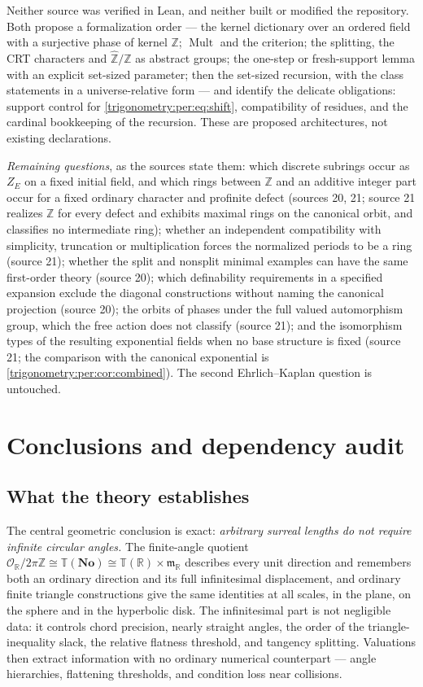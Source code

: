 \documentclass[11pt,letterpaper]{article}
\numberwithin{equation}{section}
\theoremstyle{definition}
\theoremstyle{remark}
\newcommand{\No}{\mathbf{No}}
\newcommand{\R}{\mathbb R}
\newcommand{\Z}{\mathbb Z}
\newcommand{\OO}{\mathcal O}
\newcommand{\mm}{\mathfrak m}
\newcommand{\TT}{\mathbb T}
\newcommand{\Mult}{\operatorname{Mult}}
\newcommand{\Zhat}{\widehat{\Z}}
\begin{document}
Neither source was verified in Lean, and neither built or modified the repository. Both propose a
formalization order --- the kernel dictionary over an ordered field with a surjective phase of kernel
$\Z$; $\Mult$ and the criterion; the splitting, the CRT characters and $\Zhat/\Z$ as abstract groups;
the one-step or fresh-support lemma with an explicit set-sized parameter; then the set-sized recursion,
with the class statements in a universe-relative form --- and identify the delicate obligations: support
control for \cref{trigonometry:per:eq:shift}, compatibility of residues, and the cardinal bookkeeping of
the recursion. These are proposed architectures, not existing declarations.

\emph{Remaining questions}, as the sources state them: which discrete subrings occur as $Z_E$ on a fixed
initial field, and which rings between $\Z$ and an additive integer part occur for a fixed ordinary
character and profinite defect (sources 20, 21; source 21 realizes $\Z$ for every defect and exhibits
maximal rings on the canonical orbit, and classifies no intermediate ring); whether an independent
compatibility with simplicity, truncation or multiplication forces the normalized periods to be a ring
(source 21); whether the split and nonsplit minimal examples can have the same first-order theory
(source 20); which definability requirements in a specified expansion exclude the diagonal
constructions without naming the canonical projection (source 20); the orbits of phases under the full
valued automorphism group, which the free action does not classify (source 21); and the isomorphism
types of the resulting exponential fields when no base structure is fixed (source 21; the comparison
with the canonical exponential is \cref{trigonometry:per:cor:combined}). The second Ehrlich--Kaplan
question is untouched.

\section{Conclusions and dependency audit}\label{trigonometry:sec:conclusion}

\subsection{What the theory establishes}
The central geometric conclusion is exact: \emph{arbitrary surreal lengths do not require infinite
circular angles.} The finite-angle quotient $\OO_{\R}/2\pi\Z\cong\TT(\No)\cong\TT(\R)\times\mm_{\R}$
describes every unit direction and remembers both an ordinary direction and its full infinitesimal
displacement, and ordinary finite triangle constructions give the same identities at all scales, in
the plane, on the sphere and in the hyperbolic disk. The infinitesimal part is not negligible data:
it controls chord precision, nearly straight angles, the order of the triangle-inequality slack,
the relative flatness threshold, and tangency splitting. Valuations then extract information with
no ordinary numerical counterpart --- angle hierarchies, flattening thresholds, and condition loss
near collisions.
\end{document}
